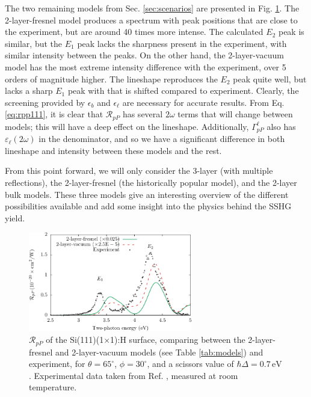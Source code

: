 The two remaining models from Sec. \ref{sec:scenarios} are presented in Fig.
\ref{fig:othermodels}. The 2-layer-fresnel model produces a spectrum with peak
positions that are close to the experiment, but are around 40 times more
intense. The calculated $E_{2}$ peak is similar, but the $E_{1}$ peak lacks the
sharpness present in the experiment, with similar intensity between the peaks.
On the other hand, the 2-layer-vacuum model has the most extreme intensity
difference with the experiment, over 5 orders of magnitude higher. The lineshape
reproduces the $E_{2}$ peak quite well, but lacks a sharp $E_{1}$ peak with that
is shifted compared to experiment. Clearly, the screening provided by
$\epsilon_{b}$ and $\epsilon_{\ell}$ are necessary for accurate results. From
Eq. \eqref{eq:rpp111}, it is clear that $\mathcal{R}_{pP}$ has several $2\omega$
terms that will change between models; this will have a deep effect on the
lineshape. Additionally, $\Gamma^{\ell}_{pP}$ also has
$\varepsilon_{\ell}(2\omega)$ in the denominator, and so we have a significant
difference in both lineshape and intensity between these models and the rest.

From this point forward, we will only consider the 3-layer (with multiple
reflections), the 2-layer-fresnel (the historically popular model), and the
2-layer bulk models. These three models give an interesting overview of the
different possibilities available and add some insight into the physics behind
the SSHG yield.

\begin{figure}[t]
\centering 
\includegraphics[width=0.64\textwidth]
{content/figures/fig-Si1x1-Mejia_RpP_models}
\caption[2-layer-fresnel and 2-layer vacuum for $\mathcal{R}_{pP}$.]
{$\mathcal{R}_{pP}$ of the Si(111)(1$\times$1):H surface, comparing between the
2-layer-fresnel and 2-layer-vacuum models (see Table
\ref{tab:models}) and experiment, for $\theta=65^{\circ}$, $\phi=30^{\circ}$,
and a scissors value of $\hbar\Delta = 0.7\,\text{eV}$. Experimental data taken
from Ref. \cite{mejiaPRB02}, measured at room temperature.}
\label{fig:othermodels}
\end{figure}

